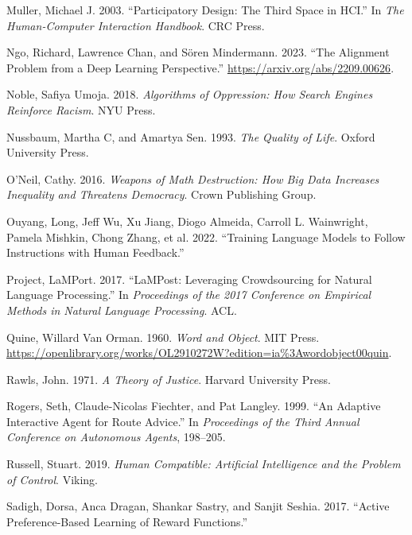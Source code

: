 \documentclass[
  letterpaper,
  numbers=noenddot,
  DIV=11]{scrreprt}
\newlength{\cslhangindent}
\newenvironment{CSLReferences}[2] %
 {\begin{list}{}{%
  \setlength{\itemindent}{0pt}
  \setlength{\leftmargin}{0pt}
  \setlength{\parsep}{0pt}
  \ifodd #1
   \setlength{\leftmargin}{\cslhangindent}
   \setlength{\itemindent}{-1\cslhangindent}
  \fi
  \setlength{\itemsep}{#2\baselineskip}}}
 {\end{list}}
\theoremstyle{definition}
\theoremstyle{plain}
\theoremstyle{plain}
\theoremstyle{remark}
\begin{document}
\begin{CSLReferences}{1}{0}
Muller, Michael J. 2003. {``Participatory Design: The Third Space in
HCI.''} In \emph{The Human-Computer Interaction Handbook}. CRC Press.

Ngo, Richard, Lawrence Chan, and Sören Mindermann. 2023. {``The
Alignment Problem from a Deep Learning Perspective.''}
\url{https://arxiv.org/abs/2209.00626}.

Noble, Safiya Umoja. 2018. \emph{Algorithms of Oppression: How Search
Engines Reinforce Racism}. NYU Press.

Nussbaum, Martha C, and Amartya Sen. 1993. \emph{The Quality of Life}.
Oxford University Press.

O'Neil, Cathy. 2016. \emph{Weapons of Math Destruction: How Big Data
Increases Inequality and Threatens Democracy}. Crown Publishing Group.

Ouyang, Long, Jeff Wu, Xu Jiang, Diogo Almeida, Carroll L. Wainwright,
Pamela Mishkin, Chong Zhang, et al. 2022. {``Training Language Models to
Follow Instructions with Human Feedback.''}

Project, LaMPort. 2017. {``LaMPost: Leveraging Crowdsourcing for Natural
Language Processing.''} In \emph{Proceedings of the 2017 Conference on
Empirical Methods in Natural Language Processing}. ACL.

Quine, Willard Van Orman. 1960. \emph{Word and Object}. MIT Press.
\url{https://openlibrary.org/works/OL2910272W?edition=ia\%3Awordobject00quin}.

Rawls, John. 1971. \emph{A Theory of Justice}. Harvard University Press.

Rogers, Seth, Claude-Nicolas Fiechter, and Pat Langley. 1999. {``An
Adaptive Interactive Agent for Route Advice.''} In \emph{Proceedings of
the Third Annual Conference on Autonomous Agents}, 198--205.

Russell, Stuart. 2019. \emph{Human Compatible: Artificial Intelligence
and the Problem of Control}. Viking.

Sadigh, Dorsa, Anca Dragan, Shankar Sastry, and Sanjit Seshia. 2017.
{``Active Preference-Based Learning of Reward Functions.''}


\end{CSLReferences}
\end{document}
